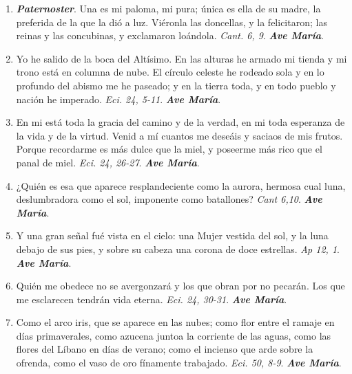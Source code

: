 \documentclass[../../devocionario.tex]{subfiles}
\begin{document}
    \begin{enumerate}
    
        \item \textbf{\textit{Paternoster}}. Una es mi paloma, mi pura; única es ella de su madre, 
            la preferida de la que la dió a luz. Viéronla las doncellas, 
            y la felicitaron; las reinas y las concubinas, y exclamaron loándola. \textit{Cant. 6, 9}. \textbf{\textit{Ave María}}.

        \item Yo he salido de la boca del Altísimo. En las alturas he armado mi tienda y mi 
            trono está en columna de nube. El círculo celeste he rodeado sola y en lo profundo 
            del abismo me he paseado; y en la tierra toda, y en todo pueblo y nación he imperado. 
            \textit{Eci. 24, 5-11}. \textbf{\textit{Ave María}}.

        \item En mi está toda la gracia del camino y de la verdad, en mi toda esperanza de la vida 
            y de la virtud. Venid a mí cuantos me deseáis y saciaos de mis frutos. Porque recordarme 
            es más dulce que la miel, y poseerme más rico que el panal de miel. \textit{Eci. 24, 26-27}. \textbf{\textit{Ave María}}.

        \item ¿Quién es esa que aparece resplandeciente como la aurora, hermosa cual luna, deslumbradora como el sol, 
            imponente como batallones? \textit{Cant 6,10}. \textbf{\textit{Ave María}}.

        \item Y una gran señal fué vista en el cielo: una Mujer vestida del sol, y la luna debajo de sus pies, 
            y sobre su cabeza una corona de doce estrellas. \textit{Ap 12, 1}. \textbf{\textit{Ave María}}.

        \item Quién me obedece no se avergonzará y los que obran por no pecarán. Los que me 
            esclarecen tendrán vida eterna. \textit{Eci. 24, 30-31}. \textbf{\textit{Ave María}}.

        \item Como el arco iris, que se aparece en las nubes; como flor entre el ramaje en 
            días primaverales, como azucena juntoa la corriente de las aguas, como las flores 
            del Líbano en días de verano; como el incienso que arde sobre la ofrenda, como el 
            vaso de oro fínamente trabajado. \textit{Eci. 50, 8-9}. \textbf{\textit{Ave María}}.


\end{enumerate}
\end{document}
